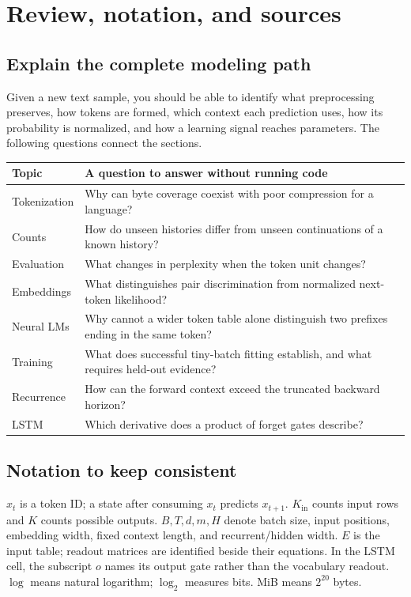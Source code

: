 \clearpage
\section*{Review, notation, and sources}\label{sec:review}
\subsection*{Explain the complete modeling path}
Given a new text sample, you should be able to identify what preprocessing
preserves, how tokens are formed, which context each prediction uses, how
its probability is normalized, and how a learning signal reaches parameters.
The following questions connect the sections.

\begin{tabularx}{\textwidth}{@{}l Y@{}}\toprule
Topic & A question to answer without running code\\\midrule
Tokenization & Why can byte coverage coexist with poor compression for a language?\\
Counts & How do unseen histories differ from unseen continuations of a known history?\\
Evaluation & What changes in perplexity when the token unit changes?\\
Embeddings & What distinguishes pair discrimination from normalized next-token likelihood?\\
Neural LMs & Why cannot a wider token table alone distinguish two prefixes ending in the same token?\\
Training & What does successful tiny-batch fitting establish, and what requires held-out evidence?\\
Recurrence & How can the forward context exceed the truncated backward horizon?\\
LSTM & Which derivative does a product of forget gates describe?\\\bottomrule
\end{tabularx}

\subsection*{Notation to keep consistent}
$x_t$ is a token ID; a state after consuming $x_t$ predicts $x_{t+1}$.
$K_{\mathrm{in}}$ counts input rows and $K$ counts possible outputs.
$B,T,d,m,H$ denote batch size, input positions, embedding width, fixed
context length, and recurrent/hidden width. $E$ is the input table;
readout matrices are identified beside their equations. In the LSTM cell,
the subscript $o$ names its output gate rather than the vocabulary readout.
$\log$ means natural logarithm; $\log_2$ measures bits. MiB means $2^{20}$ bytes.

